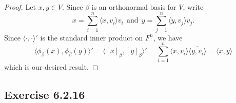 \begin{enumerate}
        \begin{proof}
            Let \( x,y \in V  \). Since \( \beta  \) is an orthonormal basis for \( V  \), write
        \[   x = \sum_{ i=1  }^{ n } \langle x , {v}_{i} \rangle {v}_{i} \ \ \text{and} \ \ y = \sum_{ j=1  }^{ n  } \langle y , {v}_{j} \rangle {v}_{j}. \]
        Since \( \langle \cdot , \cdot \rangle'  \) is the standard inner product on \( F^{n} \), we have
        \[  \langle \phi_{\beta}(x) , {\phi}_{\beta}(y)  \rangle' = \langle [x]_{\beta} , [y]_{\beta} \rangle' = \sum_{ i=1  }^{ n } \langle x , {v}_{i} \rangle \overline{\langle y , {v}_{i} \rangle} = \langle x , y \rangle \]
        which is our desired result.
        \end{proof}
\end{enumerate}

\subsection*{Exercise 6.2.16}
